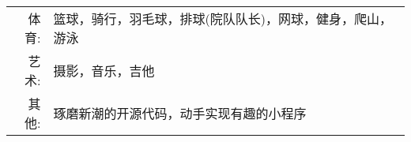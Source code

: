 %
%



\begin{tabular}{rl}
    \textsc{体育:} & 篮球，骑行，羽毛球，排球(院队队长)，网球，健身，爬山，游泳 \\
    \textsc{艺术:} & 摄影，音乐，吉他 \\ 
    \textsc{其他:} & 琢磨新潮的开源代码，动手实现有趣的小程序\\
\end{tabular}